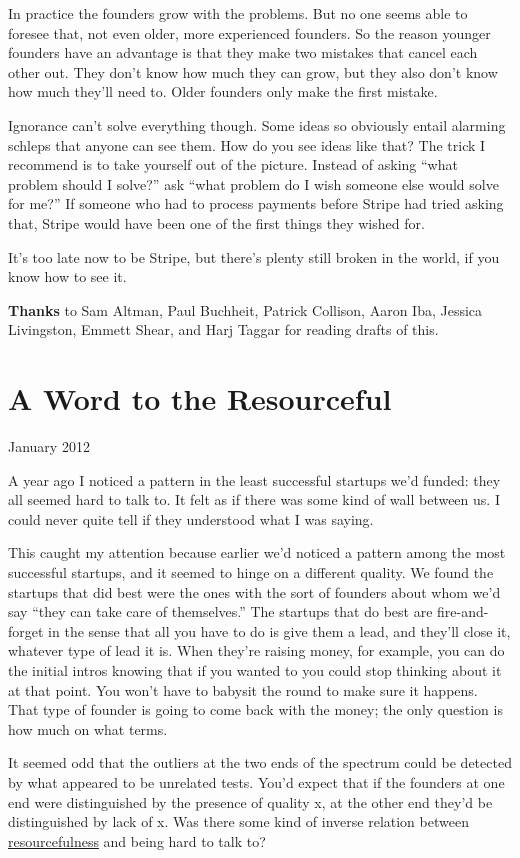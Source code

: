 \documentclass[12pt]{book}
\begin{document}
In practice the founders grow with the problems. But no one seems able
to foresee that, not even older, more experienced founders. So the
reason younger founders have an advantage is that they make two mistakes
that cancel each other out. They don't know how much they can grow, but
they also don't know how much they'll need to. Older founders only make
the first mistake.

Ignorance can't solve everything though. Some ideas so obviously entail
alarming schleps that anyone can see them. How do you see ideas like
that? The trick I recommend is to take yourself out of the picture.
Instead of asking ``what problem should I solve?'' ask ``what problem do
I wish someone else would solve for me?'' If someone who had to process
payments before Stripe had tried asking that, Stripe would have been one
of the first things they wished for.

It's too late now to be Stripe, but there's plenty still broken in the
world, if you know how to see it.

\textbf{Thanks} to Sam Altman, Paul Buchheit, Patrick Collison, Aaron
Iba, Jessica Livingston, Emmett Shear, and Harj Taggar for reading
drafts of this.
\chapter{A Word to the Resourceful}

January 2012

A year ago I noticed a pattern in the least successful startups we'd
funded: they all seemed hard to talk to. It felt as if there was some
kind of wall between us. I could never quite tell if they understood
what I was saying.

This caught my attention because earlier we'd noticed a pattern among
the most successful startups, and it seemed to hinge on a different
quality. We found the startups that did best were the ones with the sort
of founders about whom we'd say ``they can take care of themselves.''
The startups that do best are fire-and-forget in the sense that all you
have to do is give them a lead, and they'll close it, whatever type of
lead it is. When they're raising money, for example, you can do the
initial intros knowing that if you wanted to you could stop thinking
about it at that point. You won't have to babysit the round to make sure
it happens. That type of founder is going to come back with the money;
the only question is how much on what terms.

It seemed odd that the outliers at the two ends of the spectrum could be
detected by what appeared to be unrelated tests. You'd expect that if
the founders at one end were distinguished by the presence of quality x,
at the other end they'd be distinguished by lack of x. Was there some
kind of inverse relation between \href{relres.html}{resourcefulness} and
being hard to talk to?
\end{document}
